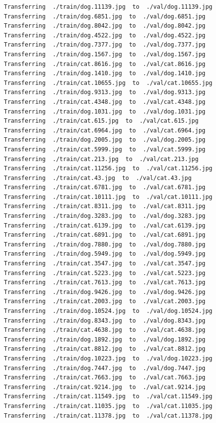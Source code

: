 \documentclass[]{book}
\theoremstyle{definition}
\theoremstyle{definition}
\theoremstyle{definition}
\theoremstyle{remark}
\begin{document}
\begin{verbatim}
Transferring  ./train/dog.11139.jpg  to  ./val/dog.11139.jpg
Transferring  ./train/dog.6851.jpg  to  ./val/dog.6851.jpg
Transferring  ./train/dog.8042.jpg  to  ./val/dog.8042.jpg
Transferring  ./train/dog.4522.jpg  to  ./val/dog.4522.jpg
Transferring  ./train/dog.7377.jpg  to  ./val/dog.7377.jpg
Transferring  ./train/dog.1567.jpg  to  ./val/dog.1567.jpg
Transferring  ./train/cat.8616.jpg  to  ./val/cat.8616.jpg
Transferring  ./train/dog.1410.jpg  to  ./val/dog.1410.jpg
Transferring  ./train/cat.10655.jpg  to  ./val/cat.10655.jpg
Transferring  ./train/dog.9313.jpg  to  ./val/dog.9313.jpg
Transferring  ./train/cat.4348.jpg  to  ./val/cat.4348.jpg
Transferring  ./train/dog.1031.jpg  to  ./val/dog.1031.jpg
Transferring  ./train/cat.615.jpg  to  ./val/cat.615.jpg
Transferring  ./train/cat.6964.jpg  to  ./val/cat.6964.jpg
Transferring  ./train/dog.2005.jpg  to  ./val/dog.2005.jpg
Transferring  ./train/cat.5999.jpg  to  ./val/cat.5999.jpg
Transferring  ./train/cat.213.jpg  to  ./val/cat.213.jpg
Transferring  ./train/cat.11256.jpg  to  ./val/cat.11256.jpg
Transferring  ./train/cat.43.jpg  to  ./val/cat.43.jpg
Transferring  ./train/cat.6781.jpg  to  ./val/cat.6781.jpg
Transferring  ./train/cat.10111.jpg  to  ./val/cat.10111.jpg
Transferring  ./train/cat.8311.jpg  to  ./val/cat.8311.jpg
Transferring  ./train/dog.3283.jpg  to  ./val/dog.3283.jpg
Transferring  ./train/cat.6139.jpg  to  ./val/cat.6139.jpg
Transferring  ./train/cat.6891.jpg  to  ./val/cat.6891.jpg
Transferring  ./train/dog.7880.jpg  to  ./val/dog.7880.jpg
Transferring  ./train/dog.5949.jpg  to  ./val/dog.5949.jpg
Transferring  ./train/cat.3547.jpg  to  ./val/cat.3547.jpg
Transferring  ./train/cat.5223.jpg  to  ./val/cat.5223.jpg
Transferring  ./train/cat.7613.jpg  to  ./val/cat.7613.jpg
Transferring  ./train/dog.9426.jpg  to  ./val/dog.9426.jpg
Transferring  ./train/cat.2003.jpg  to  ./val/cat.2003.jpg
Transferring  ./train/dog.10524.jpg  to  ./val/dog.10524.jpg
Transferring  ./train/dog.8343.jpg  to  ./val/dog.8343.jpg
Transferring  ./train/cat.4638.jpg  to  ./val/cat.4638.jpg
Transferring  ./train/dog.1892.jpg  to  ./val/dog.1892.jpg
Transferring  ./train/cat.8812.jpg  to  ./val/cat.8812.jpg
Transferring  ./train/dog.10223.jpg  to  ./val/dog.10223.jpg
Transferring  ./train/dog.7447.jpg  to  ./val/dog.7447.jpg
Transferring  ./train/cat.7663.jpg  to  ./val/cat.7663.jpg
Transferring  ./train/cat.9214.jpg  to  ./val/cat.9214.jpg
Transferring  ./train/cat.11549.jpg  to  ./val/cat.11549.jpg
Transferring  ./train/cat.11035.jpg  to  ./val/cat.11035.jpg
Transferring  ./train/cat.11378.jpg  to  ./val/cat.11378.jpg

\end{verbatim}
\end{document}
